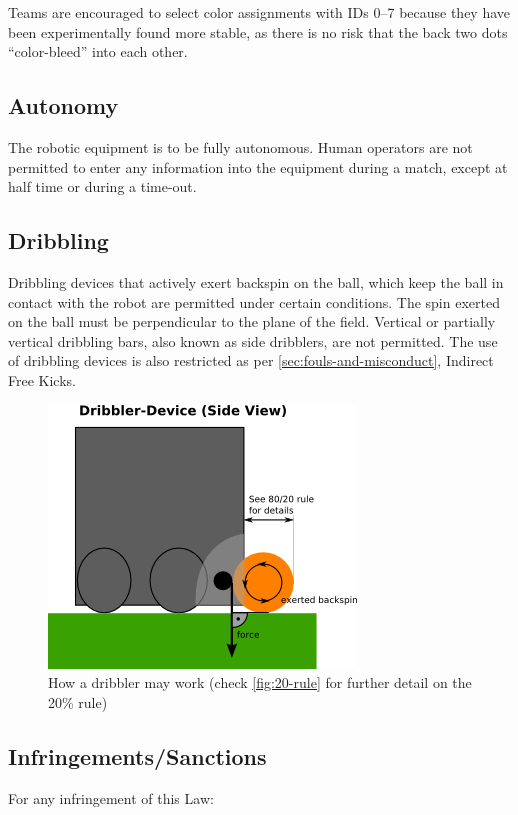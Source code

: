 Teams are encouraged to select color assignments with IDs 0--7 because they have been experimentally found more stable, as there is no risk that the back two dots ``color-bleed'' into each other.

\subsection{Autonomy}
The robotic equipment is to be fully autonomous.
Human operators are not permitted to enter any information into the equipment during a match, except at half time or during a time-out.

\subsection{Dribbling}
Dribbling devices that actively exert backspin on the ball, which keep the ball in contact with the robot are permitted under certain conditions.
The spin exerted on the ball must be perpendicular to the plane of the field.
Vertical or partially vertical dribbling bars, also known as side dribblers, are not permitted.
The use of dribbling devices is also restricted as per \autoref{sec:fouls-and-misconduct}, Indirect Free Kicks.

\begin{figure}[ht]
	\centering
	\includegraphics[width=0.5\columnwidth]{img/dribblers_1.png}
	\caption{How a dribbler may work (check \autoref{fig:20-rule} for further detail on the 20\% rule)}
	\label{fig:dribblers}
\end{figure}

\subsection{Infringements/Sanctions}
For any infringement of this Law:

